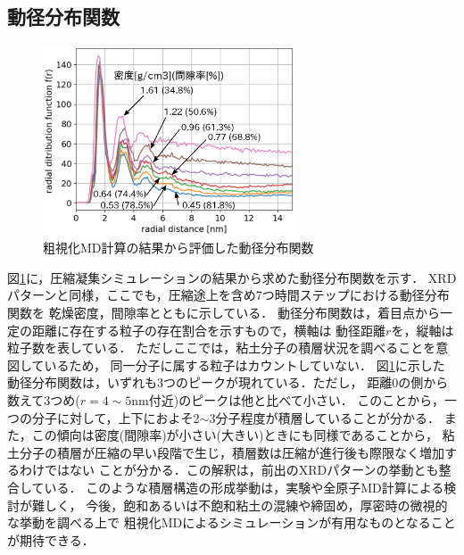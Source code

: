﻿\documentclass[11pt,a4j]{jarticle}
\begin{document}
\subsection{動径分布関数}
\begin{figure}
	\centering
	\includegraphics[keepaspectratio,width=75mm]{Figs/rdfs.eps}
	\vspace{-5mm}
	\caption{粗視化MD計算の結果から評価した動径分布関数}
	\label{fig:fig4}
\end{figure}
図\ref{fig:fig4}に，圧縮凝集シミュレーションの結果から求めた動径分布関数を示す．
XRDパターンと同様，ここでも，圧縮途上を含め7つ時間ステップにおける動径分布関数を
乾燥密度，間隙率とともに示している．
動径分布関数は，着目点から一定の距離に存在する粒子の存在割合を示すもので，横軸は
動径距離$r$を，縦軸は粒子数を表している．
ただしここでは，粘土分子の積層状況を調べることを意図しているため，
同一分子に属する粒子はカウントしていない．
図\ref{fig:fig4}に示した動径分布関数は，いずれも3つのピークが現れている．ただし，
距離0の側から数えて3つめ($r=4\sim 5$nm付近)のピークは他と比べて小さい．
このことから，一つの分子に対して，上下におよそ2$\sim$3分子程度が積層していることが分かる．
また，この傾向は密度(間隙率)が小さい(大きい)ときにも同様であることから，
粘土分子の積層が圧縮の早い段階で生じ，積層数は圧縮が進行後も際限なく増加するわけではない
ことが分かる．この解釈は，前出のXRDパターンの挙動とも整合している．
このような積層構造の形成挙動は，実験や全原子MD計算による検討が難しく，
今後，飽和あるいは不飽和粘土の混練や締固め，厚密時の微視的な挙動を調べる上で
粗視化MDによるシミュレーションが有用なものとなることが期待できる．
\end{document}
